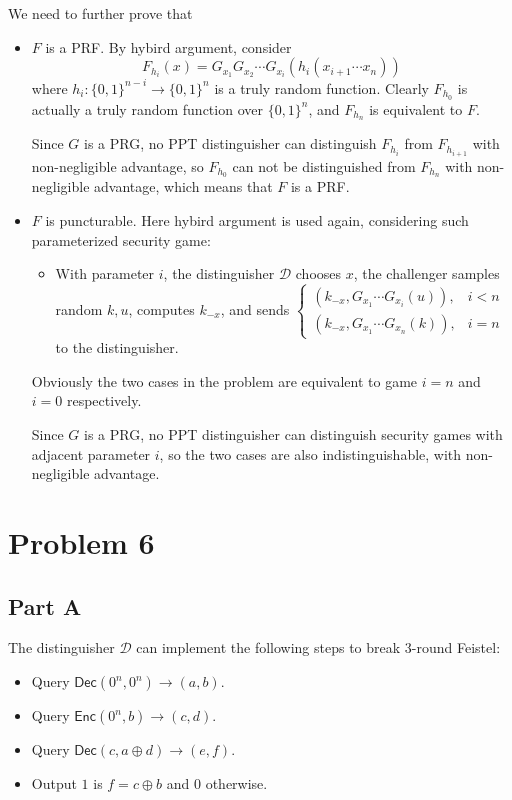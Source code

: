 \documentclass[8pt]{article}
\theoremstyle{compact}
\begin{document}
We need to further prove that \begin{itemize}
	\item $F$ is a PRF. By hybird argument, consider $$F_{h_i}(x) = G_{x_1}G_{x_2}\cdots G_{x_i}(h_i(x_{i+1}\cdots x_n))$$ where $h_i: \{0, 1\}^{n-i} \to \{0, 1\}^n$ is a truly random function. Clearly $F_{h_0}$ is actually a truly random function over $\{0, 1\}^n$, and $F_{h_n}$ is equivalent to $F$.
	
	Since $G$ is a PRG, no PPT distinguisher can distinguish $F_{h_i}$ from $F_{h_{i+1}}$ with non-negligible advantage, so $F_{h_0}$ can not be distinguished from $F_{h_n}$ with non-negligible advantage, which means that $F$ is a PRF.
	\item $F$ is puncturable. Here hybird argument is used again, considering such parameterized security game: 
	\begin{itemize}
		\item With parameter $i$, the distinguisher $\mathcal D$ chooses $x$, the challenger samples random $k, u$, computes $k_{-x}$, and sends $\begin{cases}(k_{-x}, G_{x_1}\cdots G_{x_i}(u)),& i < n \\(k_{-x}, G_{x_1}\cdots G_{x_n}(k)), & i = n\end{cases}$ to the distinguisher.
	\end{itemize}

	Obviously the two cases in the problem are equivalent to game $i=n$ and $i=0$ respectively.

	Since $G$ is a PRG, no PPT distinguisher can distinguish security games with adjacent parameter $i$, so the two cases are also indistinguishable, with non-negligible advantage.
\end{itemize}
\section*{Problem 6}
\subsection*{Part A}
The distinguisher $\mathcal D$ can implement the following steps to break 3-round Feistel: \begin{itemize}
	\item Query $\textsf{Dec}(0^n, 0^n) \to (a, b)$.
	\item Query $\textsf{Enc}(0^n, b) \to (c, d)$.
	\item Query $\textsf{Dec}(c, a\oplus d) \to (e, f)$.
	\item Output $1$ is $f = c \oplus b$ and $0$ otherwise.
\end{itemize}
\end{document}
